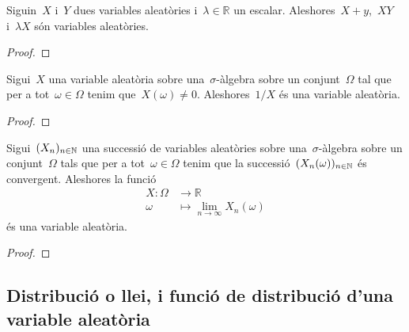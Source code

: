 \documentclass[../Apunts.tex]{subfiles}
\begin{document}
	\begin{proposition}
		\label{prop:les variables aleatòries formen un anell}
		Siguin~\(X\) i~\(Y\) dues variables aleatòries i~\(\lambda\in\mathbb{R}\) un escalar. Aleshores~\(X+y\),~\(XY\) i~\(\lambda X\) són variables aleatòries.
		\begin{proof}
		\end{proof}
	\end{proposition}
	\begin{proposition}
		\label{prop:les variables aleatòries formen un cos}
		Sigui~\(X\) una variable aleatòria sobre una~\(\sigma\)-àlgebra sobre un conjunt~\(\Omega\) tal que per a tot~\(\omega\in\Omega\) tenim que~\(X(\omega)\neq0\). Aleshores~\(1/X\) és una variable aleatòria.
		\begin{proof}
		\end{proof}
	\end{proposition}
	\begin{proposition}
		\label{prop:el cos de variables aleatòries és tancat}
		Sigui~\((X_{n})_{n\in\mathbb{N}}\) una successió de variables aleatòries sobre una~\(\sigma\)-àlgebra sobre un conjunt~\(\Omega\) tals que per a tot~\(\omega\in\Omega\) tenim que la successió~\((X_{n}(\omega))_{n\in\mathbb{N}}\) és convergent. Aleshores la funció
		\begin{align*}
			X\colon\Omega&\longrightarrow\mathbb{R} \\
			\omega&\longmapsto\lim_{n\to\infty}X_{n}(\omega)
		\end{align*}
		és una variable aleatòria.
		\begin{proof}
		\end{proof}
	\end{proposition}
\subsection{Distribució o llei, i funció de distribució d'una variable aleatòria}
	
\end{document}
